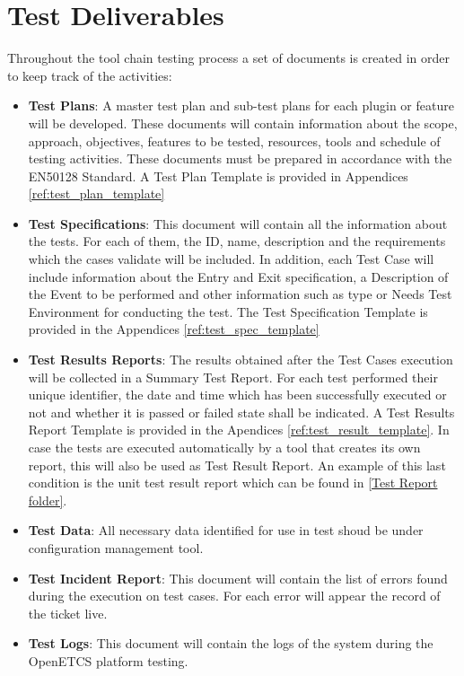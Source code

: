 \section{Test Deliverables}
Throughout the tool chain testing process a set of documents is created in order to keep track of the activities:
\begin{itemize}
\item \textbf{Test Plans}: A master test plan and sub-test plans for each plugin or feature will be developed. These documents will contain information about the scope, approach, objectives, features to be tested, resources, tools and schedule of testing activities.  These documents must be prepared in accordance with the EN50128 Standard. A Test Plan Template is provided in Appendices \ref{ref:test_plan_template}
\item \textbf{Test Specifications}: This document will contain all the information about the tests. For each of them, the ID, name, description and the requirements which the cases validate will be included. In addition, each Test Case will include information about the Entry and Exit specification, a Description of the Event to be performed and other information such as type or Needs Test Environment for conducting the test. The Test Specification Template is provided in the Appendices \ref{ref:test_spec_template}
\item \textbf{Test Results Reports}: The results obtained after the Test Cases execution will be collected in a Summary Test Report. For each test performed their unique identifier, the date and time which has been successfully executed or not and whether it is passed or failed state shall be indicated. A Test Results Report Template is provided in the Apendices \ref{ref:test_result_template}. In case the tests are executed automatically by a tool that creates its own report, this will also be used as Test Result Report. An example of this last condition is the unit test result report which can be found in \href{https://openetcs.ci.cloudbees.com/job/openETCS-tycho/lastBuild/testReport/}{[Test Report folder]}.
\item \textbf{Test Data}: All necessary data identified for use in test shoud be under configuration management tool.
\item \textbf{Test Incident Report}: This document will contain the list of errors found during the execution on test cases. For each error will appear the record of the ticket live.  
\item \textbf{Test Logs}: This document will contain the logs of the system during the OpenETCS platform testing.
\end{itemize}


